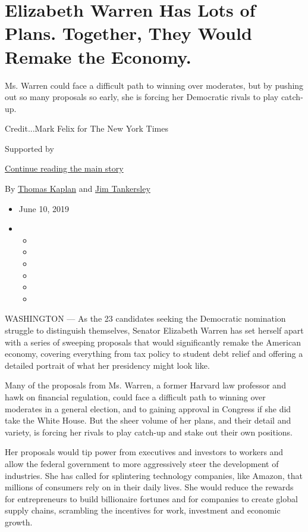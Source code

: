 \hypertarget{elizabeth-warren-has-lots-of-plans-together-they-would-remake-the-economy}{%
\section{Elizabeth Warren Has Lots of Plans. Together, They Would Remake
the
Economy.}\label{elizabeth-warren-has-lots-of-plans-together-they-would-remake-the-economy}}

Ms. Warren could face a difficult path to winning over moderates, but by
pushing out so many proposals so early, she is forcing her Democratic
rivals to play catch-up.

Credit...Mark Felix for The New York Times

Supported by

\protect\hyperlink{after-sponsor}{Continue reading the main story}

By \href{https://www.nytimes.com/by/thomas-kaplan}{Thomas Kaplan} and
\href{https://www.nytimes.com/by/jim-tankersley}{Jim Tankersley}

\begin{itemize}
\item
  June 10, 2019
\item
  \begin{itemize}
  \item
  \item
  \item
  \item
  \item
  \item
  \end{itemize}
\end{itemize}

WASHINGTON --- As the 23 candidates seeking the Democratic nomination
struggle to distinguish themselves, Senator Elizabeth Warren has set
herself apart with a series of sweeping proposals that would
significantly remake the American economy, covering everything from tax
policy to student debt relief and offering a detailed portrait of what
her presidency might look like.

Many of the proposals from Ms. Warren, a former Harvard law professor
and hawk on financial regulation, could face a difficult path to winning
over moderates in a general election, and to gaining approval in
Congress if she did take the White House. But the sheer volume of her
plans, and their detail and variety, is forcing her rivals to play
catch-up and stake out their own positions.

Her proposals would tip power from executives and investors to workers
and allow the federal government to more aggressively steer the
development of industries. She has called for splintering technology
companies, like Amazon, that millions of consumers rely on in their
daily lives. She would reduce the rewards for entrepreneurs to build
billionaire fortunes and for companies to create global supply chains,
scrambling the incentives for work, investment and economic growth.

